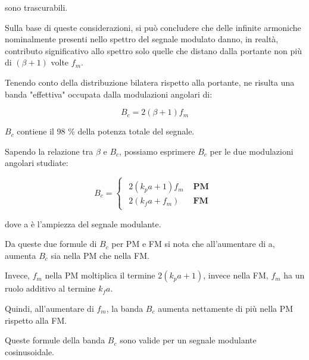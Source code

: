 sono trascurabili. \newline 

Sulla base di queste considerazioni, si può concludere che delle infinite armoniche nominalmente presenti nello spettro del segnale modulato 
danno, in realtà, contributo significativo allo spettro solo quelle che distano dalla portante non più di $(\beta + 1)$ volte $f_m$. \newline 

Tenendo conto della distribuzione bilatera rispetto alla portante, ne risulta una banda "effettiva" occupata dalla modulazioni angolari di: 

{
    \Large 
    \begin{equation}
        B_c = 2 (\beta + 1) f_m
    \end{equation}
}

$B_c$ contiene il 98 \% della potenza totale del segnale. \newline 

Sapendo la relazione tra $\beta$ e $B_c$, possiamo esprimere $B_c$ per le due modulazioni angolari studiate: 

{
    \Large 
    \begin{equation}
        B_c
        = 
        \begin{cases}
            \begin{array}{ll}
            2 (k_p a + 1) f_m & \textbf{ PM} 
            \\
            2 (k_f a + f_m) & \textbf{ FM}
            \end{array} 
        \end{cases}
    \end{equation}
}

dove a è l'ampiezza del segnale modulante. \newline 

Da queste due formule di $B_c$ per PM e FM si nota che all'aumentare di a, aumenta $B_c$ sia nella PM che nella FM. \newline 

Invece, $f_m$ nella PM moltiplica il termine $2(k_p a + 1)$, 
invece nella FM, $f_m$ ha un ruolo additivo al termine $k_f a$. \newline 

Quindi, all'aumentare di $f_m$, la banda $B_c$ aumenta nettamente di più nella PM rispetto alla FM. \newline 

Queste formule della banda $B_c$ sono valide per un segnale modulante cosinusoidale. \newline 

